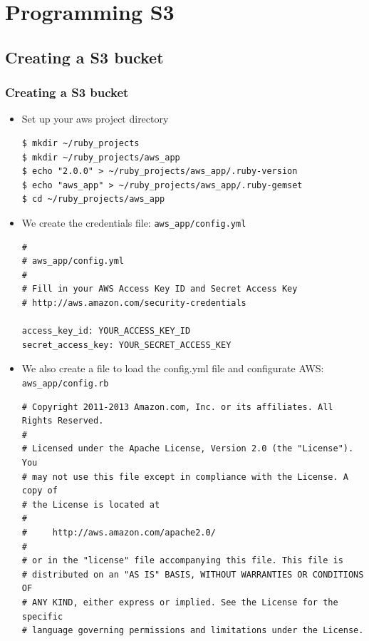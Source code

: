\documentclass{beamer}
\begin{document}
\section{Programming S3}
\subsection{Creating a S3 bucket}
\begin{frame}
\frametitle{Creating a S3 bucket}
\begin{itemize}

\item Set up your aws project directory
\lstset{language=shell, escapechar=!}
\begin{lstlisting}[escapechar=!]
$ mkdir ~/ruby_projects
$ mkdir ~/ruby_projects/aws_app
$ echo "2.0.0" > ~/ruby_projects/aws_app/.ruby-version
$ echo "aws_app" > ~/ruby_projects/aws_app/.ruby-gemset
$ cd ~/ruby_projects/aws_app
\end{lstlisting}

\item We create the credentials file: \texttt{aws\_app/config.yml}
\lstset{language=shell, escapechar=!}
\begin{lstlisting}[escapechar=!]
#
# aws_app/config.yml
#
# Fill in your AWS Access Key ID and Secret Access Key
# http://aws.amazon.com/security-credentials
               
access_key_id: YOUR_ACCESS_KEY_ID
secret_access_key: YOUR_SECRET_ACCESS_KEY
\end{lstlisting}

\item We also create a file to load the config.yml file and configurate AWS: \texttt{aws\_app/config.rb}
\lstset{language=Ruby, style=eclipse}
\begin{lstlisting}[escapechar=$]
# Copyright 2011-2013 Amazon.com, Inc. or its affiliates. All Rights Reserved.
#
# Licensed under the Apache License, Version 2.0 (the "License"). You
# may not use this file except in compliance with the License. A copy of
# the License is located at
#
#     http://aws.amazon.com/apache2.0/
#
# or in the "license" file accompanying this file. This file is
# distributed on an "AS IS" BASIS, WITHOUT WARRANTIES OR CONDITIONS OF
# ANY KIND, either express or implied. See the License for the specific
# language governing permissions and limitations under the License.


\end{lstlisting}
\end{itemize}
\end{frame}
\end{document}
